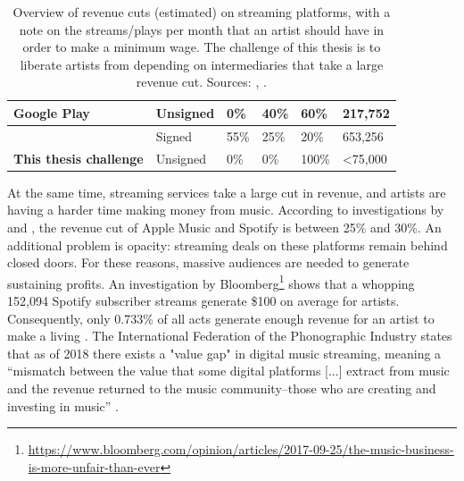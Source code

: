 \begin{table}[]
\begin{tabular}{|l|l|l|l|l|l|}
Google Play                    & Unsigned                    & 0\%                & 40\%                  & 60\%                     & 217,752                                                                                                    \\ \hline
                               & Signed                      & 55\%               & 25\%                  & 20\%                     & 653,256                                                                                                    \\ \hline
\textbf{This thesis challenge} & Unsigned                    & 0\%                & 0\%                   & 100\%                    & \textless 75,000                                                                                           \\ \hline
\end{tabular}
\caption{Overview of revenue cuts (estimated) on streaming platforms, with a note on the streams/plays per month that an artist should have in order to make a minimum wage. The challenge of this thesis is to liberate artists from depending on intermediaries that take a large revenue cut. Sources: \cite{thetrichordist2014}, \cite{digitalmusicnews2018}.}
\label{tab:revenue-cuts}
\end{table}

At the same time, streaming services take a large cut in revenue, and artists are having a harder time making money from music. According to investigations by \cite{chris2018dissecting} and \cite{recode2015}, the revenue cut of Apple Music and Spotify is between 25\% and 30\%. An additional problem is opacity: streaming deals on these platforms remain behind closed doors. For these reasons, massive audiences are needed to generate sustaining profits. An investigation by Bloomberg\footnote{\url{https://www.bloomberg.com/opinion/articles/2017-09-25/the-music-business-is-more-unfair-than-ever}} shows that a whopping 152,094 Spotify subscriber streams generate \$100 on average for artists. Consequently, only 0.733\% of all acts generate enough revenue for an artist to make a living \citep{ingham2018odds}. The International Federation of the Phonographic Industry states that as of 2018 there exists a "value gap" in digital music streaming, meaning a ``mismatch between the value that some digital platforms [...] extract from music and the revenue returned to the music community–those who are creating and investing in music'' \citep{ifpi2018global}.

